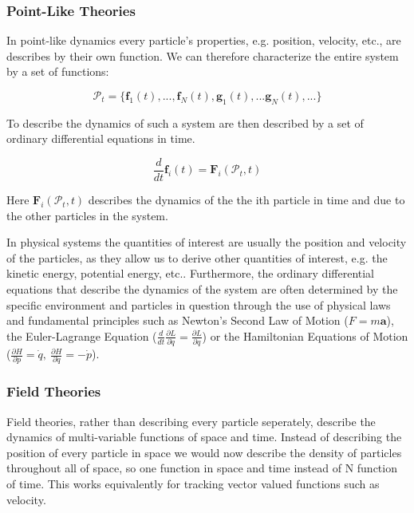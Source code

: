 \documentclass[11pt]{article}
\begin{document}
\subsubsection*{Point-Like Theories}

In point-like dynamics every particle's properties, e.g. position, velocity, etc., are describes by their own function. We can therefore characterize the entire system by a set of functions: 

\begin{equation}
    \label{point-like-set}
    \mathcal{P}_t = \{\bm{f}_1(t), ..., \bm{f}_N(t), \bm{g}_1(t), ... \bm{g}_N(t),...\}
\end{equation}

To describe the dynamics of such a system are then described by a set of ordinary differential equations in time.

\begin{equation}
    \label{point-like-ode}
    \frac{d}{dt} \bm{f}_i (t) = \bm{F}_i (\mathcal{P}_t, t)
\end{equation}

Here $\bm{F}_i(\mathcal{P}_t, t)$ describes the dynamics of the the ith particle in time and due to the other particles in the system. \par

\vspace{4mm}

In physical systems the quantities of interest are usually the position and velocity of the particles, as they allow us to derive other quantities of interest, e.g. the kinetic energy, potential energy, etc.. Furthermore, the ordinary differential equations that describe the dynamics of the system are often determined by the specific environment and particles in question through the use of physical laws and fundamental principles such as Newton's Second Law of Motion ($F = m \bm{a}$), the Euler-Lagrange Equation ($\frac{d}{dt} \frac{\partial L}{\partial \dot{q}} = \frac{\partial L}{\partial q}$) or the Hamiltonian Equations of Motion ($\frac{\partial H}{\partial p} = \dot{q}, \ \frac{\partial H}{\partial \dot{q}} = - \dot{p}$).

\subsubsection*{Field Theories}

Field theories, rather than describing every particle seperately, describe the dynamics of multi-variable functions of space and time. Instead of describing the position of every particle in space we would now describe the density of particles throughout all of space, so one function in space and time instead of N function of time. This works equivalently for tracking vector valued functions such as velocity. 
\end{document}
